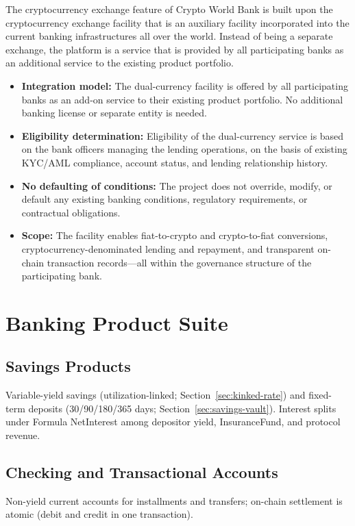 \documentclass[12pt,a4paper]{report}
\begin{document}
The cryptocurrency exchange feature of Crypto World Bank is built upon the cryptocurrency exchange facility that is an auxiliary facility incorporated into the current banking infrastructures all over the world. Instead of being a separate exchange, the platform is a service that is provided by all participating banks as an additional service to the existing product portfolio.

\begin{itemize}[noitemsep]
\item \textbf{Integration model:} The dual-currency facility is offered by all participating banks as an add-on service to their existing product portfolio. No additional banking license or separate entity is needed.
\item \textbf{Eligibility determination:} Eligibility of the dual-currency service is based on the bank officers managing the lending operations, on the basis of existing KYC/AML compliance, account status, and lending relationship history.
\item \textbf{No defaulting of conditions:} The project does not override, modify, or default any existing banking conditions, regulatory requirements, or contractual obligations.
\item \textbf{Scope:} The facility enables fiat-to-crypto and crypto-to-fiat conversions, cryptocurrency-denominated lending and repayment, and transparent on-chain transaction records---all within the governance structure of the participating bank.
\end{itemize}

\section{Banking Product Suite}
\label{sec:banking-products}

\subsection{Savings Products}
Variable-yield savings (utilization-linked; Section~\ref{sec:kinked-rate}) and fixed-term deposits (30/90/180/365 days; Section~\ref{sec:savings-vault}). Interest splits under Formula NetInterest among depositor yield, InsuranceFund, and protocol revenue.

\subsection{Checking and Transactional Accounts}
Non-yield current accounts for installments and transfers; on-chain settlement is atomic (debit and credit in one transaction).
\end{document}
